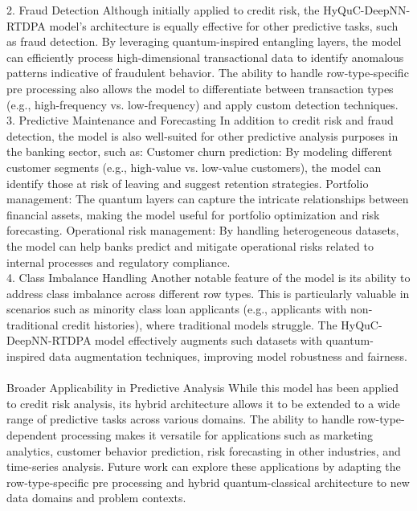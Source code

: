 \documentclass[a4paper]{article}
\begin{document}
2. Fraud Detection
Although initially applied to credit risk, the HyQuC-DeepNN-RTDPA model’s architecture is equally effective for other predictive tasks, such as fraud detection. By leveraging quantum-inspired entangling layers, the model can efficiently process high-dimensional transactional data to identify anomalous patterns indicative of fraudulent behavior. The ability to handle row-type-specific pre processing also allows the model to differentiate between transaction types (e.g., high-frequency vs. low-frequency) and apply custom detection techniques.\\

3. Predictive Maintenance and Forecasting
In addition to credit risk and fraud detection, the model is also well-suited for other predictive analysis purposes in the banking sector, such as: Customer churn prediction: By modeling different customer segments (e.g., high-value vs. low-value customers), the model can identify those at risk of leaving and suggest retention strategies.
Portfolio management: The quantum layers can capture the intricate relationships between financial assets, making the model useful for portfolio optimization and risk forecasting.
Operational risk management: By handling heterogeneous datasets, the model can help banks predict and mitigate operational risks related to internal processes and regulatory compliance.\\

4. Class Imbalance Handling
Another notable feature of the model is its ability to address class imbalance across different row types. This is particularly valuable in scenarios such as minority class loan applicants (e.g., applicants with non-traditional credit histories), where traditional models struggle. The HyQuC-DeepNN-RTDPA model effectively augments such datasets with quantum-inspired data augmentation techniques, improving model robustness and fairness. \\\\ Broader Applicability in Predictive Analysis
While this model has been applied to credit risk analysis, its hybrid architecture allows it to be extended to a wide range of predictive tasks across various domains. The ability to handle row-type-dependent processing makes it versatile for applications such as marketing analytics, customer behavior prediction, risk forecasting in other industries, and time-series analysis. Future work can explore these applications by adapting the row-type-specific pre processing and hybrid quantum-classical architecture to new data domains and problem contexts.
\end{document}
